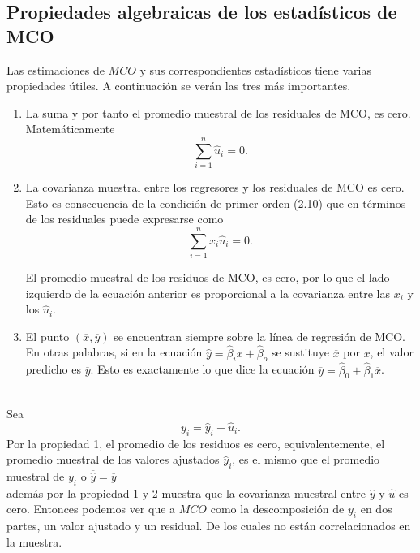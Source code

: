 \subsection{Propiedades algebraicas de los estadísticos de MCO}
Las estimaciones de $MCO$ y sus correspondientes estadísticos tiene varias propiedades útiles. A continuación se verán las tres más importantes.
\begin{enumerate}[\bfseries 1.]

    \item La suma y por tanto el promedio muestral de los residuales de MCO, es cero. Matemáticamente
	\begin{equation}
	    \sum_{i=1}^n \hat{u}_i = 0.
	\end{equation}

    \item La covarianza muestral entre los regresores y los residuales de MCO es cero. Esto es consecuencia de la condición de primer orden (2.10) que en términos de los residuales puede expresarse como
    	\begin{equation}
	    \sum_{i=1}^n x_i \hat{u}_i = 0.
	\end{equation}

	El promedio muestral de los residuos de MCO, es cero, por lo que el lado izquierdo de la ecuación anterior es proporcional a la covarianza entre las $x_i$ y los $\hat{u}_i$.

    \item El punto $(\overline{x},\overline{y})$ se encuentran siempre sobre la línea de regresión de MCO. En otras palabras, si en la ecuación $\hat{y} = \hat{\beta}_i x + \hat{\beta}_o$ se sustituye $\overline{x}$ por $x$, el valor predicho es $\overline{y}$. Esto es exactamente lo que dice la ecuación $\overline{y} = \hat{\beta}_0 + \hat{\beta}_1 \overline{x}$.\\\\
\end{enumerate}

Sea 
\begin{equation}
    y_i = \hat{y}_i + \hat{u}_i.
\end{equation}
Por la propiedad 1, el promedio de los residuos es cero, equivalentemente, el promedio muestral de los valores ajustados $\hat{y}_i$, es el mismo que el promedio muestral de $y_i$ o $\overline{\hat{y}} = \overline{y}$\\
además por la propiedad 1 y 2  muestra que la covarianza muestral entre $\hat{y}$ y $\hat{u}$ es cero. Entonces podemos ver que a $MCO$  como la descomposición de $y_i$ en dos partes, un valor ajustado y un residual. De los cuales no están correlacionados en la muestra.\\\\

